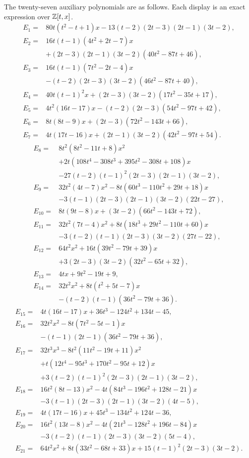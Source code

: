 \documentclass[11pt]{article}
\numberwithin{equation}{section}
\begin{document}
The twenty-seven auxiliary polynomials are as follows. Each display is an exact expression over $\mathbb Z[t,x]$.
\begin{align*}
E_1={}&80t(t^2-t+1)x-13(t-2)(2t-3)(2t-1)(3t-2),\\
E_2={}&16t(t-1)(4t^2+2t-7)x\\
&+(2t-3)(2t-1)(3t-2)(40t^2-87t+46),\\
E_3={}&16t(t-1)(7t^2-2t-4)x\\
&-(t-2)(2t-3)(3t-2)(46t^2-87t+40),\\
E_4={}&40t(t-1)^2x+(2t-3)(3t-2)(17t^2-35t+17),\\
E_5={}&4t^2(16t-17)x-(t-2)(2t-3)(54t^2-97t+42),\\
E_6={}&8t(8t-9)x+(2t-3)(72t^2-143t+66),\\
E_7={}&4t(17t-16)x+(2t-1)(3t-2)(42t^2-97t+54).
\end{align*}
\begin{align*}
E_8={}&8t^2(8t^2-11t+8)x^2\\
&+2t(108t^4-308t^3+395t^2-308t+108)x\\
&-27(t-2)(t-1)^2(2t-3)(2t-1)(3t-2),\\
E_9={}&32t^2(4t-7)x^2-8t(60t^3-110t^2+29t+18)x\\
&-3(t-1)(2t-3)(2t-1)(3t-2)(22t-27),\\
E_{10}={}&8t(9t-8)x+(3t-2)(66t^2-143t+72),\\
E_{11}={}&32t^2(7t-4)x^2+8t(18t^3+29t^2-110t+60)x\\
&-3(t-2)(t-1)(2t-3)(3t-2)(27t-22),\\
E_{12}={}&64t^2x^2+16t(39t^2-79t+39)x\\
&+3(2t-3)(3t-2)(32t^2-65t+32),\\
E_{13}={}&4tx+9t^2-19t+9,\\
E_{14}={}&32t^2x^2+8t(t^2+5t-7)x\\
&-(t-2)(t-1)(36t^2-79t+36).
\end{align*}
\begin{align*}
E_{15}={}&4t(16t-17)x+36t^3-124t^2+134t-45,\\
E_{16}={}&32t^2x^2-8t(7t^2-5t-1)x\\
&-(t-1)(2t-1)(36t^2-79t+36),\\
E_{17}={}&32t^3x^3-8t^2(11t^2-19t+11)x^2\\
&+t(12t^4-95t^3+170t^2-95t+12)x\\
&+3(t-2)(t-1)^2(2t-3)(2t-1)(3t-2),\\
E_{18}={}&16t^2(8t-13)x^2-4t(84t^3-196t^2+128t-21)x\\
&-3(t-1)(2t-3)(2t-1)(3t-2)(4t-5),\\
E_{19}={}&4t(17t-16)x+45t^3-134t^2+124t-36,\\
E_{20}={}&16t^2(13t-8)x^2-4t(21t^3-128t^2+196t-84)x\\
&-3(t-2)(t-1)(2t-3)(3t-2)(5t-4),\\
E_{21}={}&64t^2x^2+8t(33t^2-68t+33)x
+15(t-1)^2(2t-3)(3t-2).
\end{align*}
\end{document}
